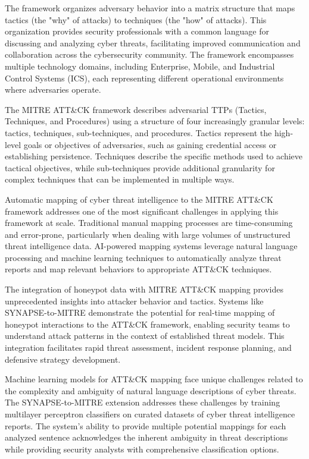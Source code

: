 The framework organizes adversary behavior into a matrix structure that maps tactics (the "why" of attacks) to techniques (the "how" of attacks). This organization provides security professionals with a common language for discussing and analyzing cyber threats, facilitating improved communication and collaboration across the cybersecurity community. The framework encompasses multiple technology domains, including Enterprise, Mobile, and Industrial Control Systems (ICS), each representing different operational environments where adversaries operate.

The MITRE ATT\&CK framework describes adversarial TTPs (Tactics, Techniques, and Procedures) using a structure of four increasingly granular levels: tactics, techniques, sub-techniques, and procedures. Tactics represent the high-level goals or objectives of adversaries, such as gaining credential access or establishing persistence. Techniques describe the specific methods used to achieve tactical objectives, while sub-techniques provide additional granularity for complex techniques that can be implemented in multiple ways.

Automatic mapping of cyber threat intelligence to the MITRE ATT\&CK framework addresses one of the most significant challenges in applying this framework at scale. Traditional manual mapping processes are time-consuming and error-prone, particularly when dealing with large volumes of unstructured threat intelligence data. AI-powered mapping systems leverage natural language processing and machine learning techniques to automatically analyze threat reports and map relevant behaviors to appropriate ATT\&CK techniques.

The integration of honeypot data with MITRE ATT\&CK mapping provides unprecedented insights into attacker behavior and tactics. Systems like SYNAPSE-to-MITRE demonstrate the potential for real-time mapping of honeypot interactions to the ATT\&CK framework, enabling security teams to understand attack patterns in the context of established threat models. This integration facilitates rapid threat assessment, incident response planning, and defensive strategy development.

Machine learning models for ATT\&CK mapping face unique challenges related to the complexity and ambiguity of natural language descriptions of cyber threats. The SYNAPSE-to-MITRE extension addresses these challenges by training multilayer perceptron classifiers on curated datasets of cyber threat intelligence reports. The system's ability to provide multiple potential mappings for each analyzed sentence acknowledges the inherent ambiguity in threat descriptions while providing security analysts with comprehensive classification options.

